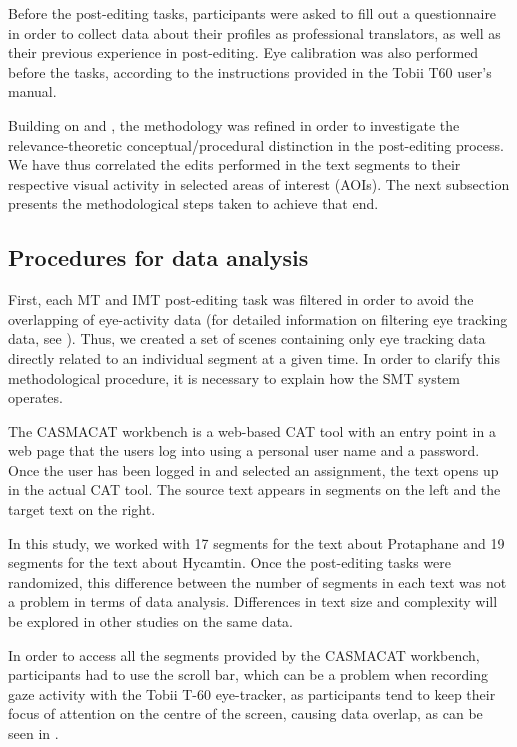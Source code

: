 \documentclass[output=paper]{langsci/langscibook}
\begin{document}
Before the post-editing tasks, participants were asked to fill out a questionnaire in order to collect data about their profiles as professional translators, as well as their previous experience in post-editing. Eye calibration was also performed before the tasks, according to the instructions provided in the Tobii T60 user's manual.



Building on \citet{alves2012} and \citet{alves2013}, the methodology was refined in order to investigate the relevance-theoretic conceptual/procedural distinction in the post-editing process. We have thus correlated the edits performed in the text segments to their respective visual activity in selected areas of interest (AOIs). The next subsection presents the methodological steps taken to achieve that end.


\subsection{Procedures for data analysis\label{alves:sec:ProceduresForDataAnalysis}}

First, each MT and IMT post-editing task was filtered in order to avoid the overlapping of eye-activity data (for detailed information on filtering eye tracking data, see \citealt{alves2012}). Thus, we created a set of scenes containing only eye tracking data directly related to an individual segment at a given time. In order to clarify this methodological procedure, it is necessary to explain how the SMT system operates.  


The CASMACAT workbench is a web-based CAT tool with an entry point in a web page that the users log into using a personal user name and a password. Once the user has been logged in and selected an assignment, the text opens up in the actual CAT tool. The source text appears in segments on the left and the target text on the right. 



In this study, we worked with 17 segments for the text about Protaphane and 19 segments for the text about Hycamtin. Once the post-editing tasks were randomized, this difference between the number of segments in each text was not a problem in terms of data analysis. Differences in text size and complexity will be explored in other studies on the same data. 



In order to access all the segments provided by the CASMACAT workbench,  participants had to use the scroll bar, which can be a problem when recording gaze activity with the Tobii T-60 eye-tracker, as participants tend to keep their focus of attention on the centre of the screen, causing data overlap, as can be seen in . 
\end{document}
